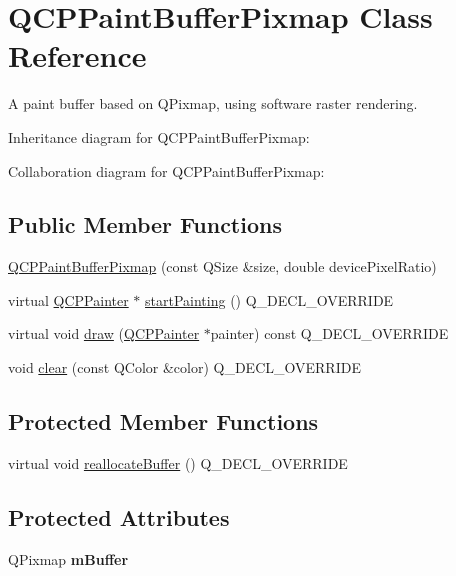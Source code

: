 \hypertarget{classQCPPaintBufferPixmap}{}\section{Q\+C\+P\+Paint\+Buffer\+Pixmap Class Reference}
\label{classQCPPaintBufferPixmap}


A paint buffer based on Q\+Pixmap, using software raster rendering.  




Inheritance diagram for Q\+C\+P\+Paint\+Buffer\+Pixmap\+:


Collaboration diagram for Q\+C\+P\+Paint\+Buffer\+Pixmap\+:
\subsection*{Public Member Functions}
\begin{DoxyCompactItemize}
\item 
\hyperlink{classQCPPaintBufferPixmap_aef0224e03b9285509391fcd61a8e6844}{Q\+C\+P\+Paint\+Buffer\+Pixmap} (const Q\+Size \&size, double device\+Pixel\+Ratio)
\item 
virtual \hyperlink{classQCPPainter}{Q\+C\+P\+Painter} $\ast$ \hyperlink{classQCPPaintBufferPixmap_a357964ef7d28cfa530338be4e5c93234}{start\+Painting} () Q\+\_\+\+D\+E\+C\+L\+\_\+\+O\+V\+E\+R\+R\+I\+DE
\item 
virtual void \hyperlink{classQCPPaintBufferPixmap_af7bfc685e56a0a9329e57cd9a265eb74}{draw} (\hyperlink{classQCPPainter}{Q\+C\+P\+Painter} $\ast$painter) const Q\+\_\+\+D\+E\+C\+L\+\_\+\+O\+V\+E\+R\+R\+I\+DE
\item 
void \hyperlink{classQCPPaintBufferPixmap_a14badbd010a3cde6b55817ccb7b65217}{clear} (const Q\+Color \&color) Q\+\_\+\+D\+E\+C\+L\+\_\+\+O\+V\+E\+R\+R\+I\+DE
\end{DoxyCompactItemize}
\subsection*{Protected Member Functions}
\begin{DoxyCompactItemize}
\item 
virtual void \hyperlink{classQCPPaintBufferPixmap_ad49f3205ba3463b1c44f8db3cfcc90f0}{reallocate\+Buffer} () Q\+\_\+\+D\+E\+C\+L\+\_\+\+O\+V\+E\+R\+R\+I\+DE
\end{DoxyCompactItemize}
\subsection*{Protected Attributes}
\begin{DoxyCompactItemize}
\item 
Q\+Pixmap {\bfseries m\+Buffer}\hypertarget{classQCPPaintBufferPixmap_a6d7009f45f03e305f2dc00e52a9225f8}{}\label{classQCPPaintBufferPixmap_a6d7009f45f03e305f2dc00e52a9225f8}

\end{DoxyCompactItemize}


